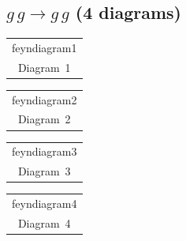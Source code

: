 \documentclass[a4paper,11pt]{article}
\makeatletter
\newcommand{\FeynDiagram}[1]{\csname feyndiagram#1\endcsname}
\newcommand{\FeynCell}[1]{\begin{tabular}[t]{@{}c@{}}\FeynDiagram{#1}\\[1ex]\small Diagram~#1\end{tabular}}
\makeatother
\begin{document}
\setlength{\parindent}{0pt}
\subsection*{$g\,g \to g\,g$ \normalfont(4 diagrams)}
\noindent \FeynCell{1}\hfill \FeynCell{2}\hfill \FeynCell{3}\par\bigskip
\noindent \FeynCell{4}\par\bigskip
\end{document}
